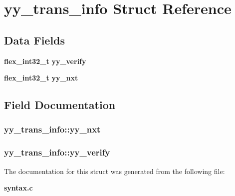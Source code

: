 \section{yy\_\-trans\_\-info Struct Reference}
\label{structyy__trans__info}
\subsection*{Data Fields}
\begin{CompactItemize}
\item 
{\bf flex\_\-int32\_\-t} {\bf yy\_\-verify}
\item 
{\bf flex\_\-int32\_\-t} {\bf yy\_\-nxt}
\end{CompactItemize}


\subsection{Field Documentation}
\subsubsection[{yy\_\-nxt}]{ {\bf yy\_\-trans\_\-info::yy\_\-nxt}}\label{structyy__trans__info_e0715250c2bef261e596e77e0030f13e}


\subsubsection[{yy\_\-verify}]{ {\bf yy\_\-trans\_\-info::yy\_\-verify}}\label{structyy__trans__info_5c9f61e770deef50bd4e697310342fe9}




The documentation for this struct was generated from the following file:\begin{CompactItemize}
\item 
{\bf syntax.c}\end{CompactItemize}
